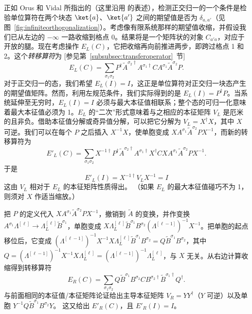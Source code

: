 正如 Orus 和 Vidal\cite{Orus08} 所指出的（这里沿用 \cite{McCulloch08} 的表述），检测正交归一的一个条件是检验单位算符在两个块态 $\ket{a}$、$\ket{a'}$ 之间的期望值是否为 $\delta_{a,a'}$（见 图~\ref{fig:infiniteorthogonalization}）。考虑像有限系统那样的期望值收缩，并假设我们已从左边的 $-\infty$ 一路收缩到格点 $0$。结果将是一个矩阵状的对象 $C_{a'a}$，对应于开放的腿。现在考虑操作 $E_L(C)$，它把收缩再向前推进两步，即跨过格点 1 和 2。这个{\em 转移算符}为 [参见第~\ref{subsubsec:transferoperator}~节]
\begin{equation}
E_L(C) = \sum_{\sigma_1\sigma_2} P^\dagger \tilde{A}^{\sigma_2\dagger} A^{\sigma_1\dagger} C A^{\sigma_1} \tilde{A}^{\sigma_2} P.
\end{equation}
对于正交归一的态，我们希望 $E_L(I) = I$，这正是单位算符对正交归一块态产生的期望值矩阵。然而，利用左规范条件，我们实际得到的是 $E_L(I)=P^\dagger P$。当系统延伸至无穷时，$E_L(I) = I$ 必须与最大本征值相联系；整个态的可归一化意味着最大本征值必须为 1。$E_L$ 的“二次”形式意味着与之相应的本征矩阵 $V_L$ 是厄米的且非负。借助本征值分解或奇异值分解，可以把它分解为 $V_L = X^\dagger X$，其中 $X$ 可逆。我们可以在每个 $P$ 之后插入 $X^{-1}X$，使单胞变成 $X A^{\sigma_1} \tilde{A}^{\sigma_2} P X^{-1}$，而新的转移算符为
\begin{equation}
E'_L(C) = \sum_{\sigma_1\sigma_2} X^{-1\dagger}P^\dagger \tilde{A}^{\sigma_2\dagger} A^{\sigma_1\dagger} X^\dagger C X A^{\sigma_1} \tilde{A}^{\sigma_2} P X^{-1}.
\end{equation}
于是
\begin{equation}
E'_L(I) = X^{-1\dagger} V_L X^{-1} = I
\end{equation}
这由 $V_L$ 相对于 $E_L$ 的本征矩阵性质得出。
（如果 $E_L$ 的最大本征值碰巧不为 1，则须对 $X$ 作适当缩放。）

把 $P$ 的定义代入 $X A^{\sigma_1}\tilde{A}^{\sigma_2}P X^{-1}$，撤销到 $\tilde{A}$ 的变换，并作变换 $A^{\sigma_1} \Lambda^{[\ell]} \rightarrow \Lambda^{[\ell]}_L \tilde{B}^{\sigma_1}$，单胞变成 $X \Lambda^{[\ell]}_L \tilde{B}^{\sigma_1} B^{\sigma_2} (\Lambda^{[\ell-1]})^{-1} X^{-1}$。把单胞的起点移位后，它变成 $(\Lambda^{[\ell-1]})^{-1} X^{-1} X \Lambda^{[\ell]}_L \tilde{B}^{\sigma_1} B^{\sigma_2} = Q \tilde{B}^{\sigma_1} B^{\sigma_2}$，其中 $Q = (\Lambda^{[\ell-1]})^{-1} X^{-1} X \Lambda_L^{[\ell]} = (\Lambda^{[\ell-1]})^{-1} \Lambda_L^{[\ell]}$，与 $X$ 无关。从右边计算收缩得到转移算符
\begin{equation}
E_R(C) = \sum_{\sigma_1\sigma_2} Q \tilde{B}^{\sigma_1} B^{\sigma_2} C B^{\sigma_2\dagger} \tilde{B}^{\sigma_1\dagger} Q^\dagger .
\end{equation}
与前面相同的本征值/本征矩阵论证给出主导本征矩阵 $V_R = YY^\dagger$（$Y$ 可逆）以及单胞 $Y^{-1}Q \tilde{B}^{\sigma_1} B^{\sigma_2} Y$。
这又给出 $E'_R(C)$，且 $E'_R(I)=I$。

